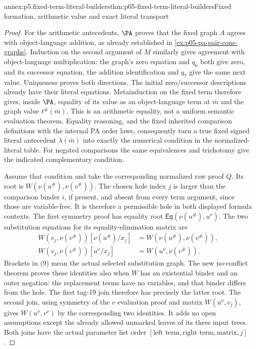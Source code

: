 \begin{annexitem}{annex:p5.fixed-term-literal-builders}{thm:p05-fixed-term-literal-builders}{Fixed formation, arithmetic value and exact literal transport}
\begin{proof}
For the arithmetic antecedents, \(\PA\) proves that the fixed graph
\(A\) agrees with object-language addition, as already established in
\cref{ex:p05-pa-pair-cons-graphs}. Induction on the second argument of
\(M\) similarly gives agreement with object-language multiplication:
the graph's zero equation and \(q_6\) both give zero, and its successor
equation, the addition identification and \(q_7\) give the same next
value. Uniqueness proves both directions. The initial zero/successor
descriptions already have their literal equations. Metainduction on the
fixed term therefore gives, inside \(\PA\), equality of its value as
an object-language term at \(\bar m\) and the graph value \(t^\#(\bar m)\).
This is an arithmetic equality, not a uniform semantic evaluation theorem.
Equality reasoning, and the fixed inherited comparison definitions with the
internal PA order laws, consequently turn a true fixed signed literal
antecedent \(\lambda(\bar m)\) into exactly the numerical condition in
the normalized-literal table. For negated comparisons the same equivalences
and trichotomy give the indicated complementary condition.

Assume that condition and take the corresponding normalized raw proof
\(Q\). Its root is \(W(\nu(u^\#),\nu(v^\#))\). The chosen hole
index \(j\) is larger than the comparison binder \(i\), if present,
and absent from every term argument, since those are variable-free. It
is therefore a permissible hole in both displayed formula contexts. The
first symmetry proof has equality root \(\mathsf{Eq}(\nu(u^\#),u^\nu)\).
The two substitution equations for its equality-elimination matrix are
\[
\begin{aligned}
 W(v_j,\nu(v^\#))[\nu(u^\#)/x_j]
       &=W(\nu(u^\#),\nu(v^\#)),\\
 W(v_j,\nu(v^\#))[u^\nu/x_j]
       &=W(u^\nu,\nu(v^\#)).
\end{aligned}
\tag{9}
\]
Brackets in (9) mean the actual selected substitution graph. The new
no-conflict theorem proves these identities also when \(W\) has an
existential binder and an outer negation: the replacement terms have no
variables, and that binder differs from the hole. The first tag-19 join
therefore has precisely the latter root. The second join, using symmetry
of the \(v\) evaluation proof and matrix \(W(u^\nu,v_j)\), gives
\(W(u^\nu,v^\nu)\) by the corresponding two identities. It adds no
open assumptions except the already allowed unmarked leaves of its three
input trees. Both joins have the actual parameter list order
\([\text{left term},\text{right term},\text{matrix},j]\).


\end{proof}
\end{annexitem}
